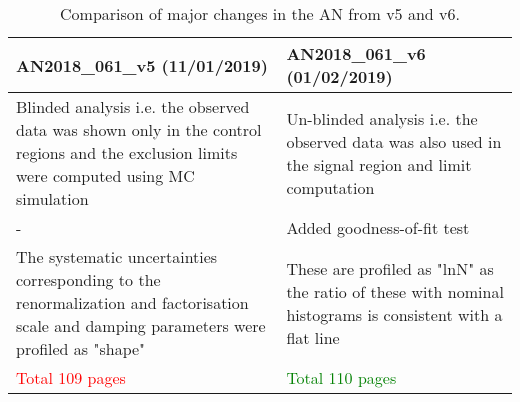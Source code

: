\begin{table}
\centering
\caption*{Comparison of major changes in the AN from v5 and
v6.}
\begin{adjustbox}{max width=\textwidth}
\begin{tabular}{p{8cm}|p{8cm}}
\hline
{\bf{AN2018\_061\_v5 (11/01/2019) }} & {\bf{AN2018\_061\_v6 (01/02/2019) }}\\
\hline
Blinded analysis i.e. the observed data was shown only in the control regions and the exclusion limits were computed using MC simulation& Un-blinded analysis i.e. the observed data was also used in the signal region and limit computation\\
\hline
- & Added goodness-of-fit test\\
\hline
The systematic uncertainties corresponding to the renormalization and factorisation scale and damping parameters  were profiled as "shape"& These are profiled as "lnN" as the ratio of these with nominal histograms is consistent with a flat line\\
\hline
\textcolor{red}{Total 109 pages}                 & \textcolor{green}{Total 110 pages}\\\hline
\end{tabular}
\end{adjustbox}
\end{table}

